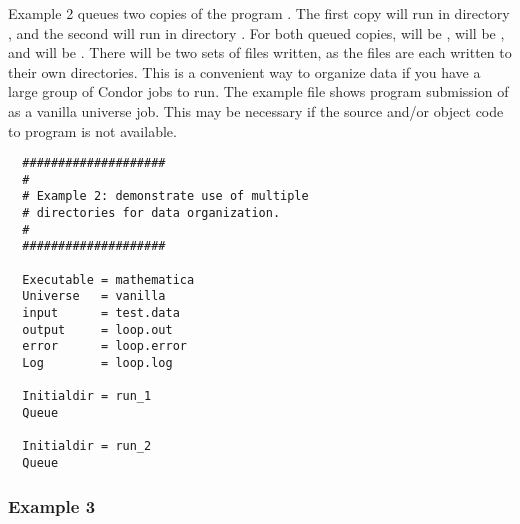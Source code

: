 Example 2 queues two copies of the program . The
first copy will run in directory , and the second will run in
directory . For both queued copies, 
 will be ,
 will be , and
 will be .
There will be two sets of files written,
as the files are each written to their own directories.
This is a convenient way to organize data if you
have a large group of Condor jobs to run. The example file 
shows program submission of
 as a vanilla universe job.
This may be necessary if the source
and/or object code to program  is not available.
\begin{verbatim}
  ####################     
  #                       
  # Example 2: demonstrate use of multiple     
  # directories for data organization.      
  #                                        
  ####################                    
                                         
  Executable = mathematica          
  Universe   = vanilla                   
  input      = test.data                
  output     = loop.out                
  error      = loop.error             
  Log        = loop.log                                                    
                                  
  Initialdir = run_1         
  Queue                         
                               
  Initialdir = run_2      
  Queue                     
\end{verbatim}

\subsubsection{Example 3}


